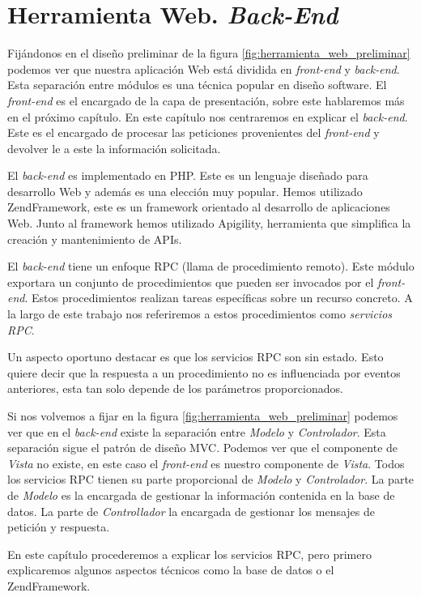 \chapter{Herramienta Web. \emph{Back-End}}
\label{backend}

Fijándonos en el diseño preliminar de la figura \ref{fig:herramienta_web_preliminar} podemos ver que nuestra aplicación Web está dividida en
\emph{front-end} y \emph{back-end}. Esta separación entre módulos es una técnica popular en diseño software. El \emph{front-end} es el encargado de
la capa de presentación, sobre este hablaremos más en el próximo capítulo. En este capítulo nos centraremos en explicar el \emph{back-end}. Este es el
encargado de procesar las peticiones provenientes del \emph{front-end} y devolver le a este la información solicitada. 
\par
El \emph{back-end} es implementado en PHP\cite{PHP}. Este es un lenguaje diseñado para desarrollo Web y además es una elección muy popular. 
Hemos utilizado ZendFramework\cite{ZF}, este es un framework orientado al desarrollo de aplicaciones Web. Junto al framework hemos utilizado
Apigility\cite{Apigility}, herramienta que simplifica la creación y mantenimiento de APIs.
\par
El \emph{back-end} tiene un enfoque RPC (llama de procedimiento remoto). Este módulo exportara un conjunto de procedimientos que pueden ser invocados
por el \emph{front-end}. Estos procedimientos realizan tareas específicas sobre un recurso concreto. A la largo de este trabajo nos referiremos
a estos procedimientos como \emph{servicios RPC}.
\par
Un aspecto oportuno destacar es que los servicios RPC son sin estado. Esto quiere decir que la respuesta a un procedimiento no es influenciada por
eventos anteriores, esta tan solo depende de los parámetros proporcionados.
\par
Si nos volvemos a fijar en la figura \ref{fig:herramienta_web_preliminar} podemos ver que en el \emph{back-end} existe la separación entre 
\emph{Modelo} y \emph{Controlador}. Esta separación sigue el patrón de diseño MVC\cite{MVCWiki}. Podemos ver que el componente de \emph{Vista} no
existe, en este caso el \emph{front-end} es nuestro componente de \emph{Vista}. Todos los servicios RPC tienen su parte proporcional de
\emph{Modelo} y \emph{Controlador}. La parte de \emph{Modelo} es la encargada de gestionar la información contenida en la base de datos. La parte de
\emph{Controllador} la encargada de gestionar los mensajes de petición y respuesta.
\par
En este capítulo procederemos a explicar los servicios RPC, pero primero explicaremos algunos aspectos técnicos como la base de datos o el ZendFramework.
